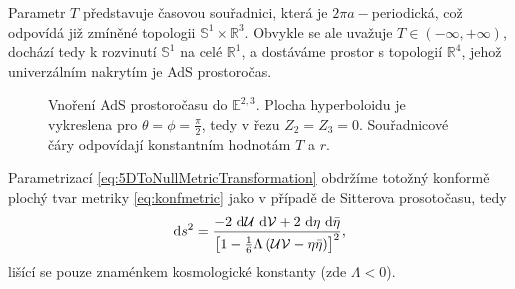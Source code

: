 Parametr $T$ představuje časovou souřadnici, která je $2 \pi a-$periodická, což odpovídá již zmíněné topologii $\mathbb{S}^1 \times \mathbb{R}^3$.
Obvykle se ale uvažuje $T \in \left(-\infty, +\infty\right)$, dochází tedy k rozvinutí $\mathbb{S}^1$ na celé $\mathbb{R}^1$, a dostáváme
prostor s topologií $\mathbb{R}^4$, jehož univerzálním nakrytím je AdS prostoročas.


\begin{figure}[H]
     \centering
     \caption{Vnoření AdS prostoročasu do $\mathbb{E}^{2,3}$. Plocha hyperboloidu je vykreslena pro $\theta=\phi=\frac{\pi}{2}$,
              tedy v řezu $Z_2 = Z_3 = 0$. Souřadnicové čáry odpovídají konstantním hodnotám $T$ a $r$.}
\end{figure}

Parametrizací \eqref{eq:5DToNullMetricTransformation} obdržíme totožný konformě plochý tvar metriky \eqref{eq:konfmetric} jako
v případě de Sitterova prosotočasu, tedy
\begin{equation*}
     \mathrm{d} s^2 = \frac{-2 ~ \mathrm{d} \mathcal{U} ~ \mathrm{d} \mathcal{V} + 2 ~ \mathrm{d} \eta ~ \mathrm{d} \bar{\eta}}{\left[1-\tfrac{1}{6} \Lambda \left(\mathcal{U} \mathcal{V} - \eta \bar{\eta}\right)\right]^2},
\end{equation*}
lišící se pouze znaménkem kosmologické konstanty (zde $\Lambda<0$).

\cleardoublepage